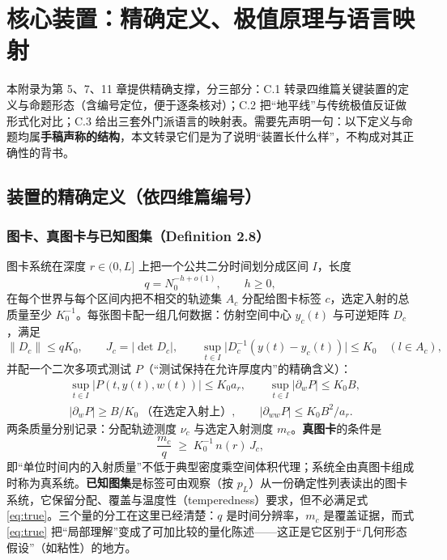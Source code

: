 \section{核心装置：精确定义、极值原理与语言映射}

本附录为第 5、7、11 章提供精确支撑，分三部分：C.1 转录四维篇关键装置的定义与命题形态（含编号定位，便于逐条核对）；C.2 把“地平线”与传统极值反证做形式化对比；C.3 给出三套外门派语言的映射表。需要先声明一句：以下定义与命题均属\textbf{手稿声称的结构}，本文转录它们是为了说明“装置长什么样”，不构成对其正确性的背书。

\subsection{装置的精确定义（依四维篇编号）}

\subsubsection*{图卡、真图卡与已知图集（Definition 2.8）}

图卡系统在深度 $r\in(0,L]$ 上把一个公共二分时间划分成区间 $I$，长度
\begin{equation}
q=N_0^{-h+o(1)},\qquad h\ge 0,
\end{equation}
在每个世界与每个区间内把不相交的轨迹集 $A_c$ 分配给图卡标签 $c$，选定入射的总质量至少 $K_0^{-1}$。每张图卡配一组几何数据：仿射空间中心 $y_c(t)$ 与可逆矩阵 $D_c$，满足
\begin{equation}
\|D_c\|\le qK_0,\qquad J_c=|\det D_c|,\qquad \sup_{t\in I}\bigl|D_c^{-1}(y(t)-y_c(t))\bigr|\le K_0\quad (l\in A_c),
\end{equation}
并配一个二次多项式测试 $P$（“测试保持在允许厚度内”的精确含义）：
\begin{equation}
\begin{aligned}
&\sup_{t\in I}|P(t,y(t),w(t))|\le K_0a_r,\qquad
\sup_{t\in I}|\partial_wP|\le K_0B,\\
&|\partial_wP|\ge B/K_0\ \text{（在选定入射上）},\qquad
|\partial_{ww}P|\le K_0B^2/a_r .
\end{aligned}
\end{equation}
两条质量分别记录：分配轨迹测度 $\nu_c$ 与选定入射测度 $m_c$。\textbf{真图卡}的条件是
\begin{equation}
\frac{m_c}{q}\;\ge\;K_0^{-1}\,n(r)\,J_c,
\label{eq:true}
\end{equation}
即“单位时间内的入射质量”不低于典型密度乘空间体积代理；系统全由真图卡组成时称为真系统。\textbf{已知图集}是标签可由观察（按 $p_L$）从一份确定性列表读出的图卡系统，它保留分配、覆盖与温度性（temperedness）要求，但不必满足式 \eqref{eq:true}。三个量的分工在这里已经清楚：$q$ 是时间分辨率，$m_c$ 是覆盖证据，而式 \eqref{eq:true} 把“局部理解”变成了可加比较的量化陈述——这正是它区别于“几何形态假设”（如粘性）的地方。


